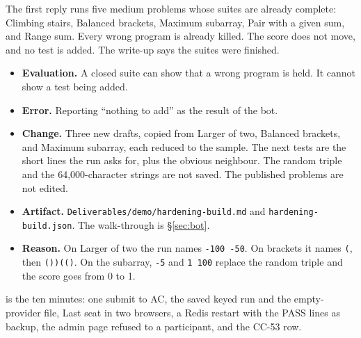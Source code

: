 \documentclass[11pt,a4paper]{article}
\newcommand{\step}[1]{\par\vspace{0.15em}{\bfseries #1}\par\vspace{-0.15em}}
\begin{document}
\step{2. Reply (summarised)}
The first reply runs five medium problems whose suites are already complete: Climbing stairs, Balanced brackets, Maximum subarray, Pair with a given sum, and Range sum. Every wrong program is already killed. The score does not move, and no test is added. The write-up says the suites were finished.

\step{3. Decision}
\begin{itemize}
\item \textbf{Evaluation.} A closed suite can show that a wrong program is held. It cannot show a test being added.
\item \textbf{Error.} Reporting ``nothing to add'' as the result of the bot.
\item \textbf{Change.} Three new drafts, copied from Larger of two, Balanced brackets, and Maximum subarray, each reduced to the sample. The next tests are the short lines the run asks for, plus the obvious neighbour. The random triple and the 64{,}000-character strings are not saved. The published problems are not edited.
\item \textbf{Artifact.} \texttt{Deliverables/demo/hardening-build.md} and \texttt{hardening-build.json}. The walk-through is \S\ref{sec:bot}.
\item \textbf{Reason.} On Larger of two the run names \texttt{-100 -50}. On brackets it names \texttt{(}, then \texttt{())(()}. On the subarray, \texttt{-5} and \texttt{1 100} replace the random triple and the score goes from 0 to 1.
\end{itemize}

 is the ten minutes: one submit to AC, the saved keyed run and the empty-provider file, Last seat in two browsers, a Redis restart with the PASS lines as backup, the admin page refused to a participant, and the CC-53 row.
\end{document}
